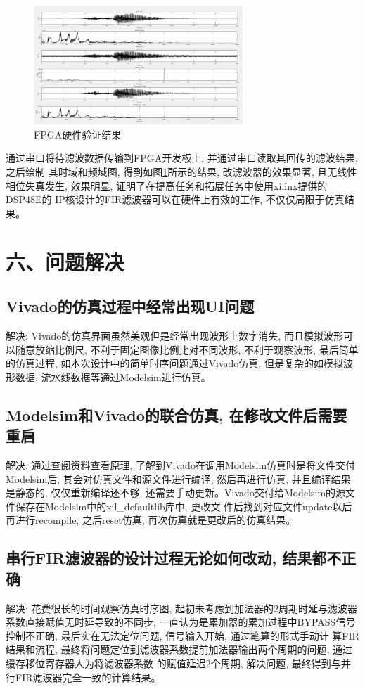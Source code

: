 \documentclass{article}
\newcommand{\fourhao}{\fontsize{14pt}{\baselineskip}\selectfont} %
\newcommand{\xiaosihao}{\fontsize{12pt}{\baselineskip}\selectfont} %
\begin{document}
\begin{figure}[H]
    \centering
    \includegraphics[width=0.7\textwidth]{image/2024-06-27-21-57-44.png}
    \caption{FPGA硬件验证结果}
    \label{image_verify_hardware_2}
\end{figure}
通过串口将待滤波数据传输到FPGA开发板上, 并通过串口读取其回传的滤波结果, 之后绘制
其时域和频域图, 得到如图\ref{image_verify_hardware_2}所示的结果, 改滤波器的效果显著, 
且无线性相位失真发生, 效果明显, 证明了在提高任务和拓展任务中使用xilinx提供的DSP48E的
IP核设计的FIR滤波器可以在硬件上有效的工作, 不仅仅局限于仿真结果。
\section*{\fourhao 六、问题解决}
\xiaosihao
{}
\subsection*{Vivado的仿真过程中经常出现UI问题}
解决: Vivado的仿真界面虽然美观但是经常出现波形上数字消失, 而且模拟波形可以随意放缩比例尺, 不利于固定图像比例比对不同波形, 
不利于观察波形, 最后简单的仿真过程, 如本次设计中的简单时序问题通过Vivado仿真, 但是复杂的如模拟波形数据, 流水线数据等通过Modelsim进行仿真。
\subsection*{Modelsim和Vivado的联合仿真, 在修改文件后需要重启}
解决: 通过查阅资料查看原理, 了解到Vivado在调用Modelsim仿真时是将文件交付Modelsim后, 其会对仿真文件和源文件进行编译, 然后再进行仿真, 
并且编译结果是静态的, 仅仅重新编译还不够, 还需要手动更新。Vivado交付给Modelsim的源文件保存在Modelsim中的xil\_defaultlib库中, 更改文
件后找到对应文件update以后再进行recompile, 之后reset仿真, 再次仿真就是更改后的仿真结果。 
\subsection*{串行FIR滤波器的设计过程无论如何改动, 结果都不正确}
解决: 花费很长的时间观察仿真时序图, 起初未考虑到加法器的2周期时延与滤波器系数直接赋值无时延导致的不同步,
一直认为是累加器的累加过程中BYPASS信号控制不正确, 最后实在无法定位问题, 信号输入开始, 通过笔算的形式手动计
算FIR结果和流程, 最终将问题定位到滤波器系数提前加法器输出两个周期的问题, 通过缓存移位寄存器人为将滤波器系数
的赋值延迟2个周期, 解决问题, 最终得到与并行FIR滤波器完全一致的计算结果。
\end{document}
